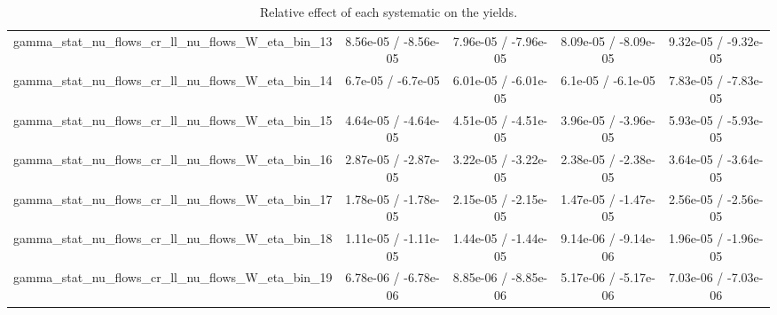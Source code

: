 \documentclass[10pt]{article}
\begin{document}
\begin{table}[htbp]
\begin{center}
\begin{tabular}{|c|c|c|c|c|}
  gamma_stat_nu_flows_cr_ll_nu_flows_W_eta_bin_13 & 8.56e-05 / -8.56e-05 & 7.96e-05 / -7.96e-05 & 8.09e-05 / -8.09e-05 & 9.32e-05 / -9.32e-05 \\ 
  gamma_stat_nu_flows_cr_ll_nu_flows_W_eta_bin_14 & 6.7e-05 / -6.7e-05 & 6.01e-05 / -6.01e-05 & 6.1e-05 / -6.1e-05 & 7.83e-05 / -7.83e-05 \\ 
  gamma_stat_nu_flows_cr_ll_nu_flows_W_eta_bin_15 & 4.64e-05 / -4.64e-05 & 4.51e-05 / -4.51e-05 & 3.96e-05 / -3.96e-05 & 5.93e-05 / -5.93e-05 \\ 
  gamma_stat_nu_flows_cr_ll_nu_flows_W_eta_bin_16 & 2.87e-05 / -2.87e-05 & 3.22e-05 / -3.22e-05 & 2.38e-05 / -2.38e-05 & 3.64e-05 / -3.64e-05 \\ 
  gamma_stat_nu_flows_cr_ll_nu_flows_W_eta_bin_17 & 1.78e-05 / -1.78e-05 & 2.15e-05 / -2.15e-05 & 1.47e-05 / -1.47e-05 & 2.56e-05 / -2.56e-05 \\ 
  gamma_stat_nu_flows_cr_ll_nu_flows_W_eta_bin_18 & 1.11e-05 / -1.11e-05 & 1.44e-05 / -1.44e-05 & 9.14e-06 / -9.14e-06 & 1.96e-05 / -1.96e-05 \\ 
  gamma_stat_nu_flows_cr_ll_nu_flows_W_eta_bin_19 & 6.78e-06 / -6.78e-06 & 8.85e-06 / -8.85e-06 & 5.17e-06 / -5.17e-06 & 7.03e-06 / -7.03e-06 \\ 
\hline 
\end{tabular} 
\caption{Relative effect of each systematic on the yields.} 
\end{center} 
\end{table} 
\end{document}
